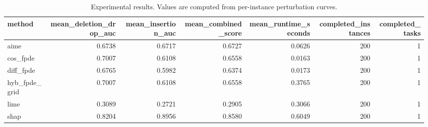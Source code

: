\begin{table}[t]
\caption{Experimental results. Values are computed from per-instance perturbation curves.}
\label{tab:main_results_computed}
\centering
\begin{tabular}{lrrrrrr}
\toprule
method & mean\_deletion\_drop\_auc & mean\_insertion\_auc & mean\_combined\_score & mean\_runtime\_seconds & completed\_instances & completed\_tasks \\
\midrule
aime & 0.6738 & 0.6717 & 0.6727 & 0.0626 & 200 & 1 \\
cos\_fpde & 0.7007 & 0.6108 & 0.6558 & 0.0163 & 200 & 1 \\
diff\_fpde & 0.6765 & 0.5982 & 0.6374 & 0.0173 & 200 & 1 \\
hyb\_fpde\_grid & 0.7007 & 0.6108 & 0.6558 & 0.3765 & 200 & 1 \\
lime & 0.3089 & 0.2721 & 0.2905 & 0.3066 & 200 & 1 \\
shap & 0.8204 & 0.8956 & 0.8580 & 0.6049 & 200 & 1 \\
\bottomrule
\end{tabular}

\end{table}
